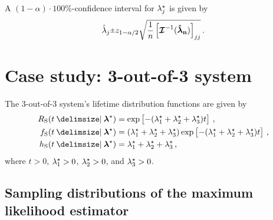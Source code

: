 \documentclass[
    11pt,
    extrafontsizes,
    article,
    oldfontcommands,
    final,
    oneside,
    openany,
    hidelinks]{memoir}
\begin{document}
A $(1-\alpha) \cdot 100 \%$-confidence interval for ${\lambda}^{\star}_j$ is 
given by
\begin{equation}
\estimator\lambda_j \raisebox{.2ex}{$\scriptstyle\pm$} z_{1-\alpha/2}
    \sqrt{\frac{1}{n} \left [ \infomatrx^{-1}(\vec{\estimator{\vec\lambda}_n}) \right ]_{j j}}\,.
\end{equation}


\section{Case study: 3-out-of-3 system}
The $3$-out-of-$3$ system's lifetime distribution functions are given by
\begin{align}
    \srv_{\sv}(t \Given \tparam{\vec\lambda}) &=
        \exp
        \left [
            -(\tparam{\lambda}_1 + \tparam{\lambda}_2 + \tparam{\lambda}_3) t
        \right ]\,,\\
    \spdf(t \Given \tparam{\vec\lambda}) &=
        (\tparam{\lambda}_1 + \tparam{\lambda}_2 + \tparam{\lambda}_3)
        \exp
        \left [
            -(\tparam{\lambda}_1 + \tparam{\lambda}_2 + \tparam{\lambda}_3) t
        \right ]\,,\\
    \haz_{\sv}(t \Given \tparam{\vec\lambda}) &= \tparam{\lambda}_1 + \tparam{\lambda}_2 + \tparam{\lambda}_3\,,
\end{align}
where $t > 0$, ${\lambda}^{\star}_1 > 0$, ${\lambda}^{\star}_2 > 0$, and ${\lambda}^{\star}_3 > 0$.

\subsection{Sampling distributions of the maximum likelihood estimator}
\end{document}
